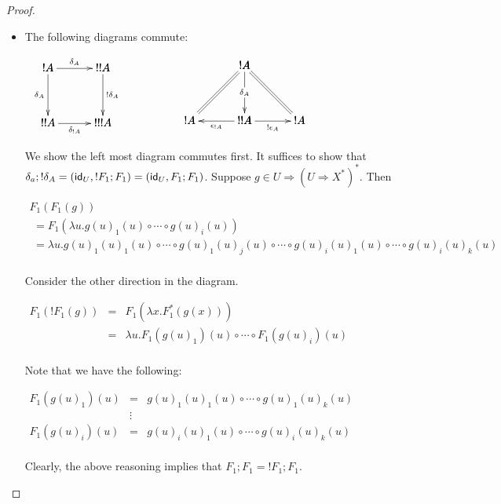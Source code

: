 \begin{proof}
\begin{center}
\begin{itemize}
    \item The following diagrams commute:
      \begin{center}
        \begin{math}
          \begin{array}{lll}
            \bfig
            \square[!A`!!A`!!A`!!!A;\delta_A`\delta_A`!\delta_A`\delta_{!A}]
            \efig
            &
              \,\,\,\,\,\,\,\,\,\,\,\,\,\,\,\,\,\,\,\,
            &
              \bfig
              \Atrianglepair/=`->`=`<-`->/[!A`!A`!!A`!A;`\delta_A``\epsilon_{!A}`!\epsilon_A]
           \efig
          \end{array}
        \end{math}
      \end{center}
      We show the left most diagram commutes first.  It suffices to
      show that
      $\delta_a;!\delta_A = (\mathsf{id}_U,!F_1;F_1) = (\mathsf{id}_U,F_1;F_1)$.  
      Suppose $g \in U \Rightarrow (U \Rightarrow X^*)^*$.  Then 
      \vspace{-15px}
      \begin{center}
        \small
        \begin{math}
          \begin{array}{lll}
            F_1(F_1(g)) \\
            \,\,= F_1(\lambda u.g(u)_1(u) \circ \cdots \circ g(u)_i(u))\\
            \,\,= \lambda u.g(u)_1(u)_1(u) \circ \cdots \circ g(u)_1(u)_j(u) \circ \cdots \circ g(u)_i(u)_1(u) \circ \cdots \circ g(u)_i(u)_k(u)\\
          \end{array}
        \end{math}
      \end{center}
      Consider the other direction in the diagram.  
      \begin{center}
        \begin{math}
          \begin{array}{lll}
            F_1(!F_1(g)) 
            & = & F_1(\lambda x.F^*_1(g(x)))\\
            & = & \lambda u.F_1(g(u)_1)(u) \circ \cdots \circ F_1(g(u)_i)(u)\\            
          \end{array}
        \end{math}
      \end{center}
      Note that we have the following:
      \begin{center}
        \begin{math}
          \begin{array}{lll}
            F_1(g(u)_1)(u) & = & g(u)_1(u)_1(u) \circ \cdots \circ g(u)_1(u)_k(u)\\
            & \vdots & \\
            F_1(g(u)_i)(u) & = & g(u)_i(u)_1(u) \circ \cdots \circ g(u)_i(u)_k(u)\\
          \end{array}
        \end{math}
      \end{center}
      Clearly, the above reasoning implies that $F_1;F_1 = !F_1;F_1$.


\end{itemize}
\end{center}
\end{proof}
